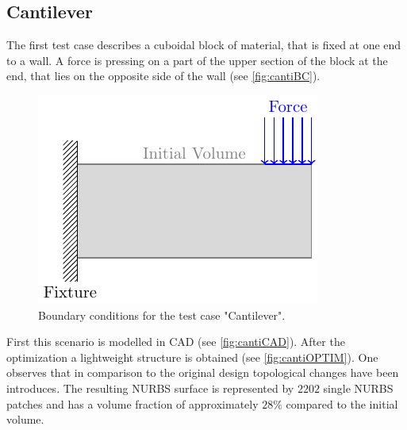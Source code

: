 \subsection{Cantilever}
\label{ssec:canti}
The first test case describes a cuboidal block of material, that is fixed at one end to a wall. A force is pressing on a part of the upper section of the block at the end, that lies on the opposite side of the wall (see \autoref{fig:cantiBC}).
\begin{figure}[H]
\begin{center}
\includegraphics[scale=1]{Pictures/tikzCantilever/canti.pdf}
\end{center}
\caption{Boundary conditions for the test case "Cantilever".}
\label{fig:cantiBC}
\end{figure}
First this scenario is modelled in CAD (see \autoref{fig:cantiCAD}). After the optimization a lightweight structure is obtained (see \autoref{fig:cantiOPTIM}). One observes that in comparison to the original design topological changes have been introduces. The resulting NURBS surface is represented by $2202$ single NURBS patches and has a volume fraction of approximately $28\%$ compared to the initial volume.
